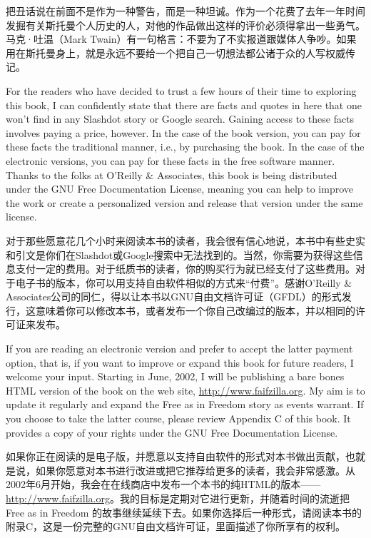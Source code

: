 \ifdefined\chs
把丑话说在前面不是作为一种警告，而是一种坦诚。作为一个花费了去年一年时间发掘有关斯托曼个人历史的人，对他的作品做出这样的评价必须得拿出一些勇气。马克·吐温（Mark Twain）有一句格言：不要为了不实报道跟媒体人争吵。如果用在斯托曼身上，就是永远不要给一个把自己一切想法都公诸于众的人写权威传记。
\fi

\ifdefined\eng
For the readers who have decided to trust a few hours of their time to exploring this book, I can confidently state that there are facts and quotes in here that one won't find in any Slashdot story or Google search. Gaining access to these facts involves paying a price, however. In the case of the book version, you can pay for these facts the traditional manner, i.e., by purchasing the book. In the case of the electronic versions, you can pay for these facts in the free software manner. Thanks to the folks at O'Reilly \& Associates, this book is being distributed under the GNU Free Documentation License, meaning you can help to improve the work or create a personalized version and release that version under the same license.
\fi

\ifdefined\chs
对于那些愿意花几个小时来阅读本书的读者，我会很有信心地说，本书中有些史实和引文是你们在Slashdot或Google搜索中无法找到的。当然，你需要为获得这些信息支付一定的费用。对于纸质书的读者，你的购买行为就已经支付了这些费用。对于电子书的版本，你可以用支持自由软件相似的方式来``付费''。感谢O’Reilly \& Associates公司的同仁，得以让本书以GNU自由文档许可证（GFDL）的形式发行，这意味着你可以修改本书，或者发布一个你自己改编过的版本，并以相同的许可证来发布。
\fi

\ifdefined\eng
If you are reading an electronic version and prefer to accept the latter payment option, that is, if you want to improve or expand this book for future readers, I welcome your input. Starting in June, 2002, I will be publishing a bare bones HTML version of the book on the web site, \url{http://www.faifzilla.org}. My aim is to update it regularly and expand the Free as in Freedom story as events warrant. If you choose to take the latter course, please review Appendix C of this book. It provides a copy of your rights under the GNU Free Documentation License.
\fi

\ifdefined\chs
如果你正在阅读的是电子版，并愿意以支持自由软件的形式对本书做出贡献，也就是说，如果你愿意对本书进行改进或把它推荐给更多的读者，我会非常感激。从2002年6月开始，我会在在线商店中发布一个本书的纯HTML的版本——\url{http://www.faifzilla.org}。我的目标是定期对它进行更新，并随着时间的流逝把Free as in Freedom 的故事继续延续下去。如果你选择后一种形式，请阅读本书的附录C，这是一份完整的GNU自由文档许可证，里面描述了你所享有的权利。
\fi

